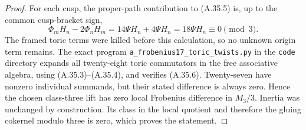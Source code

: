 \begin{proof}
For each cusp, the proper-path contribution to
(A.35.5) is, up to the common cusp-bracket sign,
\[
 \Phi_mH_n-2\Phi_nH_m
     =14\Psi H_n+4\Psi H_n
     =18\Psi H_n\equiv0\pmod3.
 \tag{A.35.6}
\]
The framed toric terms were killed before this
calculation, so no unknown origin term remains.
The exact program \texttt{a\_frobenius17\_toric\_twists.py}
in the \texttt{code} directory expands all twenty-eight
toric commutators in the free associative algebra,
using (A.35.3)--(A.35.4), and verifies (A.35.6).
Twenty-seven have nonzero individual summands, but
their stated difference is always zero.
Hence the chosen class-three lift has zero local
Frobenius difference in $M_3/3$. Inertia was unchanged
by construction. Its class in the local quotient
and therefore the gluing cokernel modulo three is
zero, which proves the statement.
\end{proof}

